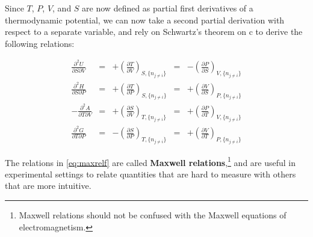 \documentclass[
  9pt,
]{extbook}
\theoremstyle{definition}
\theoremstyle{definition}
\theoremstyle{definition}
\theoremstyle{remark}
\begin{document}
Since \(T\), \(P\), \(V\), and \(S\) are now defined as partial first derivatives of a thermodynamic potential, we can now take a second partial derivation with respect to a separate variable, and rely on Schwartz's theorem on c to derive the following relations:

\begin{equation}
\begin{aligned}
\frac{\partial^2 U }{\partial S \partial V} &=& +\left(\frac{\partial T}{\partial V}\right)_{S,\{n_{j \neq i}\}} &=& -\left(\frac{\partial P}{\partial S}\right)_{V,\{n_{j \neq i}\}}   \\
\frac{\partial^2 H }{\partial S \partial P} &=& +\left(\frac{\partial T}{\partial P}\right)_{S,\{n_{j \neq i}\}} &=& +\left(\frac{\partial V}{\partial S}\right)_{P,\{n_{j \neq i}\}}  \\
-\frac{\partial^2 A }{\partial T \partial V} &=& +\left(\frac{\partial S}{\partial V}\right)_{T,\{n_{j \neq i}\}} &=& +\left(\frac{\partial P}{\partial T}\right)_{V,\{n_{j \neq i}\}}  \\
\frac{\partial^2 G }{\partial T \partial P} &=& -\left(\frac{\partial S}{\partial P}\right)_{T,\{n_{j \neq i}\}} &=& +\left(\frac{\partial V}{\partial T}\right)_{P,\{n_{j \neq i}\}}
\end{aligned}
\label{eq:maxrelf}
\end{equation}

The relations in \eqref{eq:maxrelf} are called \textbf{Maxwell relations},\footnote{Maxwell relations should not be confused with the Maxwell equations of electromagnetism.} and are useful in experimental settings to relate quantities that are hard to measure with others that are more intuitive.
\end{document}

